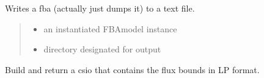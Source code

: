 \documentclass[letterpaper,12pt,english]{sphinxmanual}
\begin{document}
\begin{fulllineitems}

\pysigstartsignatures
\pysiglinewithargsret
{}
{\sphinxparamcomma {}}
{}
\pysigstopsignatures
\sphinxAtStartPar
Writes a fba (actually just dumps it) to a text file.
\begin{quote}\begin{description}
\begin{itemize}
\item {} 
\sphinxAtStartPar
{} \textendash{} an instantiated FBAmodel instance

\item {} 
\sphinxAtStartPar
{} \textendash{} directory designated for output

\end{itemize}

\end{description}\end{quote}

\end{fulllineitems}



\begin{fulllineitems}

\pysigstartsignatures
\pysiglinewithargsret
{}
{\sphinxparamcomma {}}
{}
\pysigstopsignatures
\sphinxAtStartPar
Build and return a csio that contains the flux bounds in LP format.

\end{fulllineitems}
\end{document}
